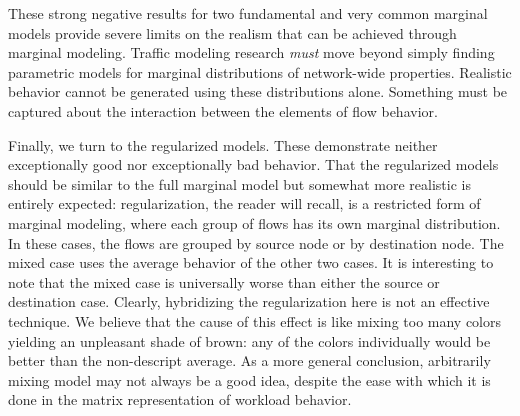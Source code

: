 \documentclass[twocolumn,final]{svjour3}
\newcommand{\caps}[1]{{\small{#1}}}
\newcommand{\Section}[1]{\hyperref[sec:#1]{Section~\ref*{sec:#1}}}
\newcommand{\model}[1]{\textsf{\small{#1}}}
\newcommand{\E}[1]{\left<#1\right>}
\begin{document}
These strong negative results for two fundamental and very common marginal models provide severe limits on the realism that can be achieved through marginal modeling. Traffic modeling research \textit{must} move beyond simply finding parametric models for marginal distributions of network-wide properties. Realistic behavior cannot be generated using these distributions alone. Something must be captured about the interaction between the elements of flow behavior.

Finally, we turn to the regularized models. These demonstrate neither exceptionally good nor exceptionally bad behavior. That the regularized models should be similar to the \model{full marginal} model but somewhat more realistic is entirely expected: regularization, the reader will recall, is a restricted form of marginal modeling, where each group of flows has its own marginal distribution. In these cases, the flows are grouped by source node or by destination node. The mixed case uses the average behavior of the other two cases. It is interesting to note that the mixed case is universally worse than either the source or destination case. Clearly, hybridizing the regularization here is not an effective technique. We believe that the cause of this effect is like mixing too many colors yielding an unpleasant shade of brown: any of the colors individually would be better than the non-descript average. As a more general conclusion, arbitrarily mixing model may not always be a good idea, despite the ease with which it is done in the matrix representation of workload behavior.

\end{document}
